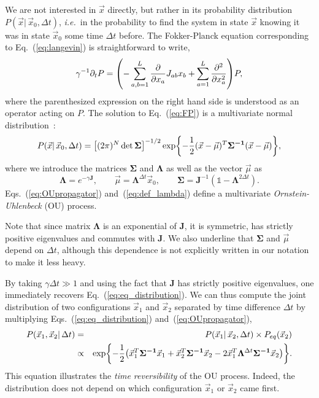 \documentclass[preprint,amsmath,amssymb,superscriptaddress,showpacs,pre]{revtex4-1}
\let\originalleft\left
\let\originalright\right
\renewcommand{\left}{\mathopen{}\mathclose\bgroup\originalleft}
\renewcommand{\right}{\aftergroup\egroup\originalright}
\newcommand{\ie}{\emph{i.e.}}
\def\vx{\vec x}
\newcommand{\Lam}{\bm{\Lambda}}
\newcommand{\Sig}{\bm{\Sigma}}
\newcommand{\curlynormalpar}[1]{\exp\left\{-\frac{1}{2}\left( #1 \right)\right\}}
\newcommand{\curlynormal}[1]{\exp\left\{-\frac{1}{2} #1 \right\}}
\newcommand{\iSig}{\bm{\Sigma^{-1}}}
\begin{document}
We are not interested in $\vx$ directly, but rather in its probability distribution $P(\vx\vert\,\vx_0,\Delta t)$, \ie~in the probability to find the system in state $\vx$ knowing it was in state $\vx_0$ some time $\Delta t$ before. 
The Fokker-Planck equation corresponding to Eq.~(\ref{eq:langevin}) is straightforward to write, 
\begin{equation}
	\gamma^{-1} \partial_t P = \left(-\sum_{a,b=1}^L\frac{\partial}{\partial x_a} J_{ab}x_b + \sum_{a=1}^L\frac{\partial^2}{\partial x_a^2}\right) P, 
	\label{eq:FP}
\end{equation}
where the parenthesized expression on the right hand side is understood as an operator acting on $P$. 
The solution to Eq.~(\ref{eq:FP}) is a multivariate normal distribution~\cite{singh2017multiOU}:
\begin{equation}
	P(\vx|\, \vx_0, \Delta t) = \left[(2\pi)^N\det\Sig\right]^{-1/2}
	\curlynormal{(\vx-\vec{\mu})^T\iSig(\vx- \vec{\mu})},
	\label{eq:OUpropagator}
\end{equation}
where we introduce the matrices $\Sig$ and $\Lam$ as well as the vector $\vec{\mu}$ as 
\begin{equation}
	\Lam = e^{-\gamma\bm{J}}, \qquad \vec{\mu} = \Lam^{\Delta t} \vx_0, \qquad \Sig = \bm{J}^{-1}(\mathbb{1} - \Lam^{2 \Delta t}).
	\label{eq:def_lambda}
\end{equation}
Eqs.~(\ref{eq:OUpropagator}) and~(\ref{eq:def_lambda}) define a multivariate \emph{Ornstein-Uhlenbeck} (OU) process. 

Note that since matrix $\Lam$ is an exponential of $\bm{J}$, it is symmetric, has strictly positive eigenvalues and commutes with $\bm{J}$. 
We also underline that $\Sig$ and $\vec{\mu}$ depend on $\Delta t$, although this dependence is not explicitly written in our notation to make it less heavy. 

By taking $\gamma\Delta t \gg 1$ and using the fact that $\bm{J}$ has strictly positive eigenvalues, one immediately recovers Eq.~(\ref{eq:eq_distribution}). 
We can thus compute the joint distribution of two configurations $\vx_1$ and $\vx_2$ separated by time difference $\Delta t$ by multiplying Eqs.~(\ref{eq:eq_distribution}) and~(\ref{eq:OUpropagator}), 
\begin{eqnarray}
    P(\vx_1, \vx_2\vert\,\Delta t) &= & P(\vx_1 |\, \vx_2,\Delta t) \times P_{eq}(\vx_2)
    \nonumber\\
    &\propto& \curlynormalpar{\vx_1^T\iSig\vx_1 + \vx_2^T\iSig\vx_2 - 2\vx_1^T\Lam^{\Delta t}\iSig\vx_2}. 
	\label{eq:OUjoint}	
\end{eqnarray}
This equation illustrates the \emph{time reversibility} of the OU process. 
Indeed, the distribution does not depend on which configuration $\vx_1$ or $\vx_2$ came first.
\end{document}
